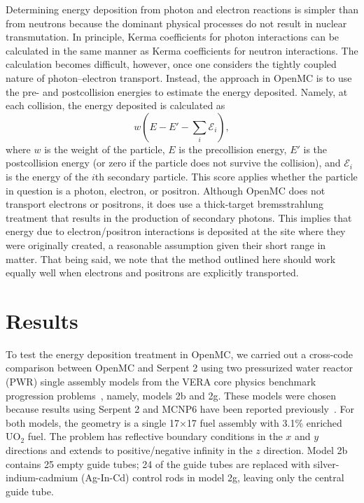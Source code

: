 \documentclass{anstrans}
\begin{document}
Determining energy deposition from photon and electron reactions is simpler than
from neutrons because the dominant physical processes do not result in nuclear
transmutation. In principle, Kerma coefficients for photon interactions can be
calculated in the same manner as Kerma coefficients for neutron interactions.
The calculation becomes difficult, however, once one considers the tightly coupled nature of
photon--electron transport. Instead, the approach in OpenMC is to use the pre-
and postcollision energies to estimate the energy deposited. Namely, at each
collision, the energy deposited is calculated as
\begin{equation}
    w \left ( E - E' - \sum_i \mathcal{E}_i \right ),
\end{equation}
where $w$ is the weight of the particle, $E$ is the precollision energy, $E'$
is the postcollision energy (or zero if the particle does not survive the
collision), and $\mathcal{E}_i$ is the energy of the $i$th secondary particle.
This score applies whether the particle in question is a photon, electron, or
positron. Although OpenMC does not transport electrons or positrons, it does use
a thick-target bremsstrahlung treatment that results in the production of
secondary photons. This implies that energy due to electron/positron
interactions is deposited at the site where they were originally created, a
reasonable assumption given their short range in matter. That being said, we
note that the method outlined here should work equally well when electrons and
positrons are explicitly transported.

\section{Results}

To test the energy deposition treatment in OpenMC, we carried out a cross-code comparison
between OpenMC and Serpent 2 using two pressurized water reactor
(PWR) single assembly models from the VERA core physics benchmark progression
problems~\cite{godfrey2014casl}, namely, models 2b and 2g. These models were
chosen because results using Serpent 2 and MCNP6 have been reported
previously~\cite{tuominen2019ane}. For both models, the geometry is a single
17$\times$17 fuel assembly with 3.1\% enriched UO$_2$ fuel. The problem has
reflective boundary conditions in the $x$ and $y$ directions and extends to
positive/negative infinity in the $z$ direction. Model 2b contains 25 empty
guide tubes; 24 of the guide tubes are replaced with silver-indium-cadmium
(Ag-In-Cd) control rods in model 2g, leaving only the central guide tube.
\end{document}
